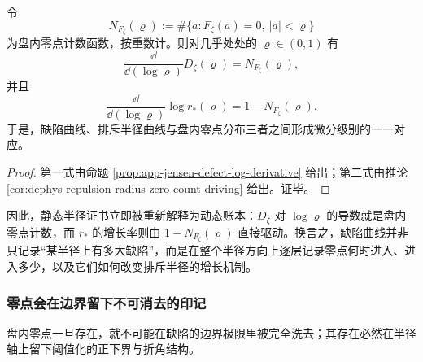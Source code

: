 \begin{proposition}[对数半径导数律与排斥半径驱动律]\label{prop:typed-address-biaxial-completion-jensen-defect-log-derivative}
令
\[
N_{F_{\zeta}}(\varrho)
:=
\#\{a:F_{\zeta}(a)=0,\ |a|<\varrho\}
\]
为盘内零点计数函数，按重数计。则对几乎处处的 \(\varrho\in(0,1)\) 有
\[
\frac{\dd}{\dd(\log\varrho)}D_{\zeta}(\varrho)=N_{F_{\zeta}}(\varrho),
\]
并且
\[
\frac{\dd}{\dd(\log\varrho)}\log r_{\ast}(\varrho)
=
1-N_{F_{\zeta}}(\varrho).
\]
于是，缺陷曲线、排斥半径曲线与盘内零点分布三者之间形成微分级别的一一对应。
\end{proposition}
\begin{proof}
第一式由命题 \ref{prop:app-jensen-defect-log-derivative} 给出；第二式由推论 \ref{cor:dephys-repulsion-radius-zero-count-driving} 给出。证毕。
\end{proof}

因此，静态半径证书立即被重新解释为动态账本：\(D_{\zeta}\) 对 \(\log\varrho\) 的导数就是盘内零点计数，而 \(r_{\ast}\) 的增长率则由 \(1-N_{F_{\zeta}}(\varrho)\) 直接驱动。换言之，缺陷曲线并非只记录“某半径上有多大缺陷”，而是在整个半径方向上逐层记录零点何时进入、进入多少，以及它们如何改变排斥半径的增长机制。

\subsubsection{零点会在边界留下不可消去的印记}\label{subsubsec:typed-address-biaxial-completion-jensen-defect-boundary-imprint}
盘内零点一旦存在，就不可能在缺陷的边界极限里被完全洗去；其存在必然在半径轴上留下阈值化的正下界与折角结构。

